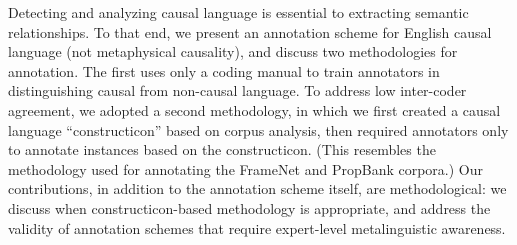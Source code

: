 Detecting and analyzing causal language is essential to extracting semantic relationships. To that end, we present an annotation scheme for English causal language (not metaphysical causality), and discuss two methodologies for annotation. The first uses only a coding manual to train annotators in distinguishing causal from non-causal language. To address low inter-coder agreement, we adopted a second methodology, in which we first created a causal language ``constructicon'' based on corpus analysis, then required annotators only to annotate instances based on the constructicon. (This resembles the methodology used for annotating the FrameNet and PropBank corpora.) Our contributions, in addition to the annotation scheme itself, are methodological: we discuss when constructicon-based methodology is appropriate, and address the validity of annotation schemes that require expert-level metalinguistic awareness.
